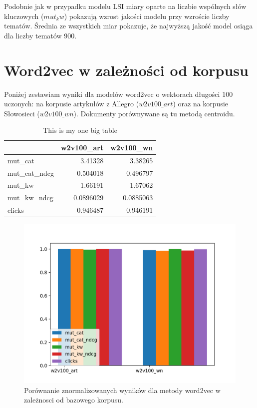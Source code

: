 \documentclass[pl]{minipw} %
\begin{document}
Podobnie jak w przypadku modelu LSI miary oparte na liczbie wspólnych słów kluczowych ($mut_kw$) pokazują wzrost jakości modelu przy wzroście liczby tematów. Średnia ze wszystkich miar pokazuje, że najwyższą jakość model osiąga dla liczby tematów 900.


\section{Word2vec w zależności od korpusu}

Poniżej zestawiam wyniki dla modelów word2vec o wektorach długości 100 uczonych: na korpusie artykułów z Allegro ($w2v100\_art$) oraz na korpusie Słowosieci ($w2v100\_wn$). Dokumenty porównywane są tu metodą centroidu.

\begin{table}
	\centering
	\begin{tabular}{lrr}
		\hline
		&   w2v100\_art &   w2v100\_wn \\
		\hline
		mut\_cat      &    3.41328   &   3.38265   \\
		mut\_cat\_ndcg &    0.504018  &   0.496797  \\
		mut\_kw       &    1.66191   &   1.67062   \\
		mut\_kw\_ndcg  &    0.0896029 &   0.0885063 \\
		clicks       &    0.946487  &   0.946191  \\
		\hline
	\end{tabular}
	\caption{This is my one big table}
\end{table}

\begin{figure}[H]
	\centering
	\includegraphics[width=1\textwidth]{img/results/w2v100_art_w2v100_wn_.png}
	\caption{Porównanie znormalizowanych wyników dla metody word2vec w zależnosci od bazowego korpusu.}
\end{figure}
\end{document}
